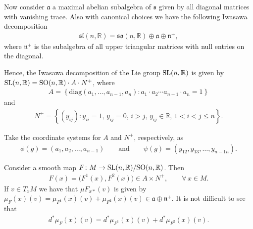 \documentclass[pdftex]{sigma}
\numberwithin{equation}{section}
\begin{document}
Now consider ${\mathfrak a}$ a maximal abelian subalgebra of ${\mathfrak s}$ given by all diagonal matrices  with va\-nishing trace. Also with canonical choices we have the following Iwasawa decomposition
\begin{gather*}
  {\mathfrak{sl}}(n, {\mathbb R})= {\mathfrak{so}}(n,{\mathbb R}) \oplus {\mathfrak a} \oplus {\mathfrak n}^{+} ,
\end{gather*}
where ${\mathfrak n}^{+}$ is the subalgebra of all upper triangular matrices with null entries on the diagonal.

Hence, the Iwasawa decomposition of the Lie group ${\rm SL}(n,\mathbb{R})$ is given by ${\rm SL}(n,\mathbb{R})= {\rm SO}(n,\mathbb{R})  \cdot A \cdot N^{+}$, where
\begin{gather*}
  A = \left\{ \textrm{diag}(a_1, \ldots, a_{n-1},a_n)
\colon a_1\cdot a_2\cdots   a_{n-1}\cdot a_n = 1
  \right\}
\end{gather*}
and
\begin{gather*}
  N^{+} = \left\{(y_{ij})\colon  y_{ii}=1, \, y_{ij} = 0,\, i>j, \, y_{ij} \in {\mathbb R}, \, 1<i<j\leq n
  \right\} .
\end{gather*}

Take the coordinate systems for $A$ and $N^{+}$, respectively, as
\begin{gather}\label{coordi}
  \phi(g) = (a_1,a_2,\ldots,a_{n-1}) \qquad \textrm{and} \qquad \psi(g) = (y_{12},y_{13}, \ldots,y_{n-1n}).
\end{gather}

Consider a smooth map $F\colon M \rightarrow {\rm SL}(n,\mathbb{R})/{\rm SO}(n,\mathbb{R})$. Then
\begin{gather*}
  F(x) = \big(F^1(x),F^2(x)\big) \in  A\times N^{+},\qquad \forall\, x \in M.
\end{gather*}
If $ v \in T_xM$ we have that $ \mu F_{x*}(v)$ is given by $\mu_{F}(x)(v)= \mu_{F^1}(x)(v) + \mu_{F^2}(x)(v) \in \mathfrak{a} \oplus \mathfrak{n}^{+}$. It is not dif\/f\/icult to see that
\begin{gather*}
  d^*\mu_{F}(x)(v)  = d^*\mu_{F^1}(x)(v) + d^*\mu_{F^2}(x)(v).
\end{gather*}
\end{document}
